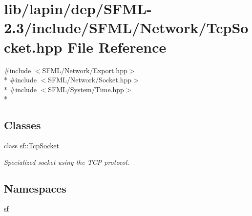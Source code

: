 \hypertarget{lapin_2dep_2_s_f_m_l-2_83_2include_2_s_f_m_l_2_network_2_tcp_socket_8hpp}{\section{lib/lapin/dep/\-S\-F\-M\-L-\/2.3/include/\-S\-F\-M\-L/\-Network/\-Tcp\-Socket.hpp File Reference}
\label{lapin_2dep_2_s_f_m_l-2_83_2include_2_s_f_m_l_2_network_2_tcp_socket_8hpp}
}
{\ttfamily \#include $<$S\-F\-M\-L/\-Network/\-Export.\-hpp$>$}\\*
{\ttfamily \#include $<$S\-F\-M\-L/\-Network/\-Socket.\-hpp$>$}\\*
{\ttfamily \#include $<$S\-F\-M\-L/\-System/\-Time.\-hpp$>$}\\*
\subsection*{Classes}
\begin{DoxyCompactItemize}
\item 
class \hyperlink{classsf_1_1_tcp_socket}{sf\-::\-Tcp\-Socket}
\begin{DoxyCompactList}\small\item\em Specialized socket using the T\-C\-P protocol. \end{DoxyCompactList}\end{DoxyCompactItemize}
\subsection*{Namespaces}
\begin{DoxyCompactItemize}
\item 
\hyperlink{namespacesf}{sf}
\end{DoxyCompactItemize}
